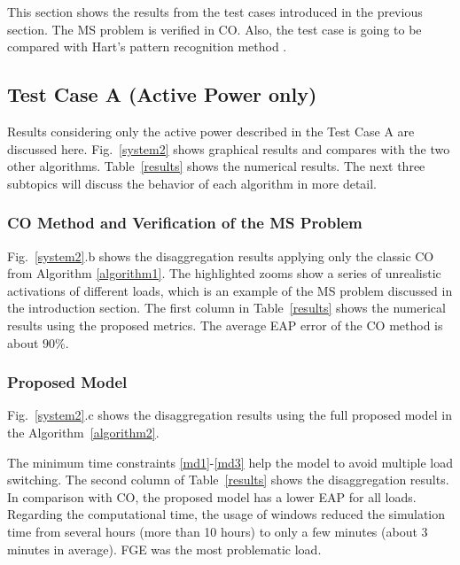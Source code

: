 This section shows the results from the test cases introduced in the previous section. The MS problem is verified in CO. Also, the test case is going to be compared with Hart's pattern recognition method \cite{hart}.

\subsection{Test Case A (Active Power only)}

Results considering only the active power described in the Test Case A are discussed here. Fig.~\ref{system2} shows graphical results and compares with the two other algorithms. Table~\ref{results} shows the numerical results. The next three subtopics will discuss the behavior of each algorithm in more detail.

\subsubsection{CO Method and Verification of the MS Problem}

Fig.~\ref{system2}.b shows the disaggregation results applying only the classic CO from Algorithm \ref{algorithm1}. The highlighted zooms show a series of unrealistic activations of different loads, which is an example of the MS problem discussed in the introduction section. The first column in Table~\ref{results} shows the numerical results using the proposed metrics.  The average EAP error of the CO method is about $90\%$. 


\subsubsection{Proposed Model}
Fig.~\ref{system2}.c shows the disaggregation results using the full proposed model in the Algorithm~\ref{algorithm2}. 


The minimum time constraints \eqref{md1}-\eqref{md3} help the model to avoid multiple load switching. The second column of Table~\ref{results} shows the disaggregation results. In comparison with CO, the proposed model has a lower EAP for all loads.
Regarding the computational time, the usage of windows reduced the simulation time from several hours (more than 10 hours) to only a few minutes (about 3 minutes in average). FGE was the most problematic load.

